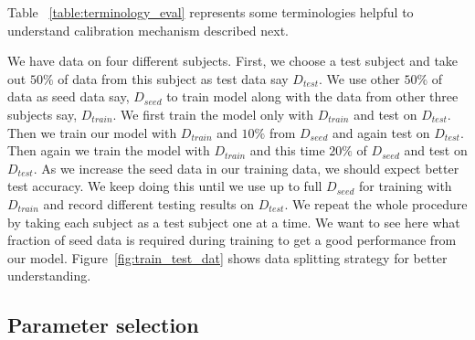 \documentclass[10pt,twocolumn,letterpaper]{article}
\begin{document}
Table ~\ref{table:terminology_eval} represents some terminologies helpful to understand calibration mechanism described next.

We have data on four different subjects. First, we choose a test subject and take out $50\%$ of data from this subject as test data say $D_{test}$. We use other $50\%$ of data as seed data say, $D_{seed}$ to train model along with the data from other three subjects say, $D_{train}$. We first train the model only with $D_{train}$ and test on $D_{test}$. Then we train our model with $D_{train}$ and $10\%$ from $D_{seed}$ and again test on $D_{test}$. Then again we train the model with $D_{train}$ and this time $20\%$ of $D_{seed}$ and test on $D_{test}$. As we increase the seed data in our training data, we should expect better test accuracy. We keep doing this until we use up to full $D_{seed}$ for training with $D_{train}$ and record different testing results on $D_{test}$. We repeat the whole procedure by taking each subject as a test subject one at a time. We want to see here what fraction of seed data is required during training to get a good performance from our model. Figure~\ref{fig:train_test_dat} shows data splitting strategy for better understanding.

\subsection{Parameter selection}
\end{document}
